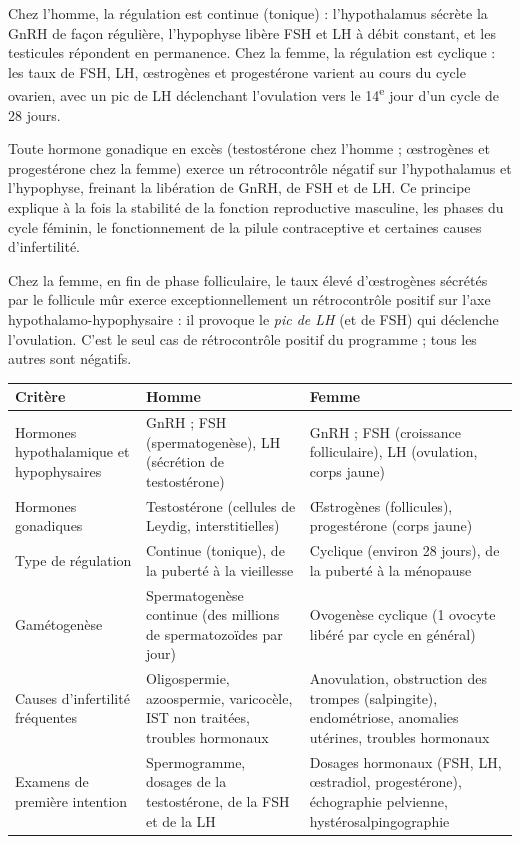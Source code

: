 \documentclass[11pt]{article}
\newcommand{\cle}[1]{{\popxbold\color{popdark}#1}}
\begin{document}
Chez l'homme, la régulation est \cle{continue} (tonique) : l'hypothalamus sécrète la GnRH de façon régulière, l'hypophyse libère FSH et LH à débit constant, et les testicules répondent en permanence. Chez la femme, la régulation est \cle{cyclique} : les taux de FSH, LH, œstrogènes et progestérone varient au cours du cycle ovarien, avec un pic de LH déclenchant l'ovulation vers le 14\textsuperscript{e} jour d'un cycle de 28 jours.

\begin{propriete}
Toute hormone gonadique en excès (testostérone chez l'homme ; œstrogènes et progestérone chez la femme) exerce un \cle{rétrocontrôle négatif} sur l'hypothalamus et l'hypophyse, freinant la libération de GnRH, de FSH et de LH. Ce principe explique à la fois la stabilité de la fonction reproductive masculine, les phases du cycle féminin, le fonctionnement de la pilule contraceptive et certaines causes d'infertilité.
\end{propriete}

\begin{attention}
Chez la femme, en fin de phase folliculaire, le taux élevé d'\cle{œstrogènes} sécrétés par le follicule mûr exerce exceptionnellement un \cle{rétrocontrôle positif} sur l'axe hypothalamo-hypophysaire : il provoque le \emph{pic de LH} (et de FSH) qui déclenche l'ovulation. C'est le seul cas de rétrocontrôle positif du programme ; tous les autres sont négatifs.
\end{attention}

\begin{center}
\begin{tabularx}{\linewidth}{|l|X|X|}
\hline
\rowcolor{popblueL} \textbf{Critère} & \textbf{Homme} & \textbf{Femme} \\
\hline
Hormones hypothalamique et hypophysaires & GnRH ; FSH (spermatogenèse), LH (sécrétion de testostérone) & GnRH ; FSH (croissance folliculaire), LH (ovulation, corps jaune) \\
\hline
Hormones gonadiques & Testostérone (cellules de Leydig, interstitielles) & Œstrogènes (follicules), progestérone (corps jaune) \\
\hline
Type de régulation & Continue (tonique), de la puberté à la vieillesse & Cyclique (environ 28 jours), de la puberté à la ménopause \\
\hline
Gamétogenèse & Spermatogenèse continue (des millions de spermatozoïdes par jour) & Ovogenèse cyclique (1 ovocyte libéré par cycle en général) \\
\hline
Causes d'infertilité fréquentes & Oligospermie, azoospermie, varicocèle, IST non traitées, troubles hormonaux & Anovulation, obstruction des trompes (salpingite), endométriose, anomalies utérines, troubles hormonaux \\
\hline
Examens de première intention & Spermogramme, dosages de la testostérone, de la FSH et de la LH & Dosages hormonaux (FSH, LH, œstradiol, progestérone), échographie pelvienne, hystérosalpingographie \\
\hline
\end{tabularx}
\end{center}
\end{document}
